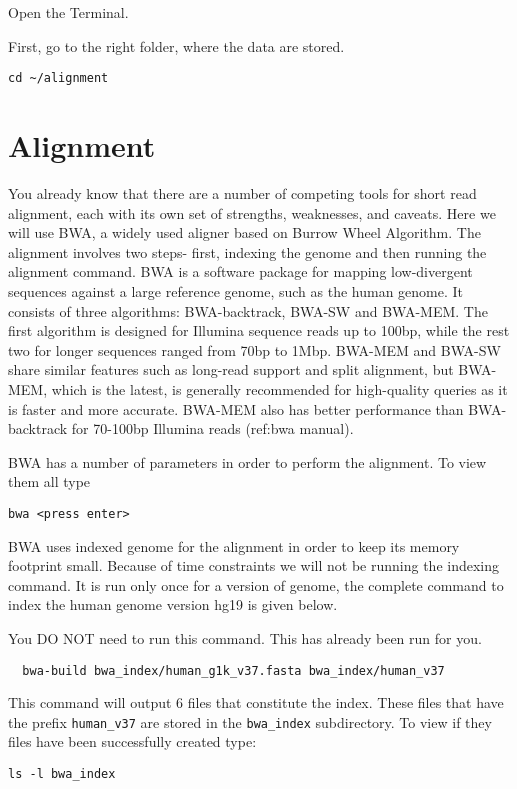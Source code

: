 \begin{steps}
Open the Terminal.

First, go to the right folder, where the data are stored.
\begin{lstlisting}
cd ~/alignment
\end{lstlisting}

\end{steps}

\section{Alignment}

\begin{information}
You already know that there are a number of competing tools for short read alignment, each with its own set of strengths, weaknesses, and caveats. Here we will use BWA, a widely used aligner based on Burrow Wheel Algorithm.  The alignment involves two steps- first, indexing the genome and then running the alignment command.  
BWA is a software package for mapping low-divergent sequences against a large reference genome, such as the human genome. It consists of three algorithms: BWA-backtrack, BWA-SW and BWA-MEM. The first algorithm is designed for Illumina sequence reads up to 100bp, while the rest two for longer sequences ranged from 70bp to 1Mbp. BWA-MEM and BWA-SW share similar features such as long-read support and split alignment, but BWA-MEM, which is the latest, is generally recommended for high-quality queries as it is faster and more accurate. BWA-MEM also has better performance than BWA-backtrack for 70-100bp Illumina reads (ref:bwa manual).
\end{information}

\begin{steps}
BWA has a number of parameters in order to perform the alignment. To view them all type

\begin{lstlisting}
bwa <press enter> 
\end{lstlisting}

BWA uses indexed genome for the alignment in order to keep its memory footprint small. Because of time constraints we will not be running the indexing command. It is run only once for a version of genome, the complete command to index the human genome version hg19 is given below. 

\begin{warning}
  You DO NOT need to run this command. This has already been run for you.
  \begin{lstlisting}
  bwa-build bwa_index/human_g1k_v37.fasta bwa_index/human_v37
  \end{lstlisting}
\end{warning}

This command will output 6 files that constitute the index. These files that have the prefix \texttt{human_v37} are stored in the \texttt{bwa\_index} subdirectory. To view if they files have been successfully created type:

\begin{lstlisting}
ls -l bwa_index
\end{lstlisting}
\end{steps}

